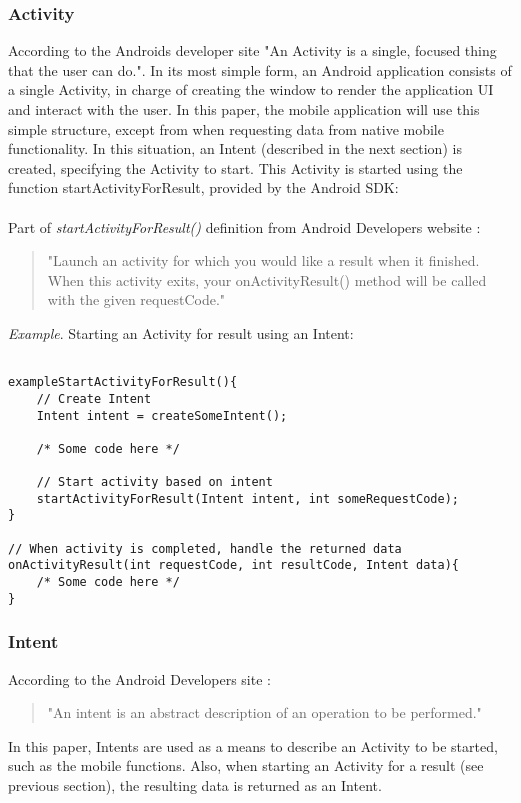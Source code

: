 \subsubsection{Activity}\label{subsubsec:activity}
According to the Androids developer site \cite{activity2015} "An Activity is a single, focused thing that the user can do.". In its most simple form, an Android application consists of a single Activity, in charge of creating the window to render the application UI and interact with the user. In this paper, the mobile application will use this simple structure, except from when requesting data from native mobile functionality. In this situation, an Intent (described in the next section) is created, specifying the Activity to start. This Activity is started using the function startActivityForResult, provided by the Android SDK:
\\\\
Part of \emph{startActivityForResult()} definition from Android Developers website \cite{androiddevelopers2015}:\\
\begin{quotation}
"Launch an activity for which you would like a result when it finished. When this activity exits, your onActivityResult() method will be called with the given requestCode."
\end{quotation}

\emph{Example}. Starting an Activity for result using an Intent:
\begin{lstlisting}

exampleStartActivityForResult(){
	// Create Intent
	Intent intent = createSomeIntent();
	
	/* Some code here */
	
	// Start activity based on intent
	startActivityForResult(Intent intent, int someRequestCode);
}

// When activity is completed, handle the returned data
onActivityResult(int requestCode, int resultCode, Intent data){
	/* Some code here */
}
\end{lstlisting}

\subsubsection{Intent}\label{subsubsec:intent}
According to the Android Developers site \cite{intent2015}:
\begin{quotation}
"An intent is an abstract description of an operation to be performed."
\end{quotation}
In this paper, Intents are used as a means to describe an Activity to be started, such as the mobile functions. Also, when starting an Activity for a result (see previous section), the resulting data is returned as an Intent. 

